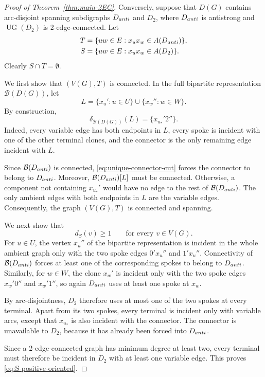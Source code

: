 \documentclass[10pt,a4paper]{amsart}
\newcommand{\UG}{\operatorname{UG}}
\newcommand{\cB}{\mathcal{B}}
\begin{document}
\begin{proof}[Proof of Theorem~\ref{thm:main-2EC}]
Conversely, suppose that $D(G)$ contains arc-disjoint spanning
subdigraphs $D_{\rm anti}$ and $D_2$, where $D_{\rm anti}$ is
antistrong and $\UG(D_2)$ is 2-edge-connected.  Let
\begin{align*}
 T&=\{uw\in E:x_ux_w\in A(D_{\rm anti})\},\\
 S&=\{uw\in E:x_ux_w\in A(D_2)\}.
\end{align*}
Clearly $S\cap T=\emptyset$.

We first show that $(V(G),T)$ is connected. In the full bipartite representation $\cB(D(G))$, let
\[
   L=\{x_u':u\in U\}\cup\{x_w'':w\in W\}.
\]
By construction,
\begin{equation}\label{eq:unique-connector-cut}
   \delta_{\cB(D(G))}(L)=\{x_{u_*}'2''\}.
\end{equation}
Indeed, every variable edge has both endpoints in $L$, every spoke is incident with one of the other terminal clones, and the connector is the only remaining edge incident with $L$.

Since $\cB(D_{\rm anti})$ is connected,
\eqref{eq:unique-connector-cut} forces the connector to belong to $D_{\rm anti}$.  Moreover, $\cB(D_{\rm anti})[L]$ must be connected.  Otherwise, a component not containing $x_{u_*}'$ would
have no edge to the rest of $\cB(D_{\rm anti})$. The only ambient edges with both endpoints in $L$ are the variable edges. Consequently, the graph $(V(G),T)$ is connected and spanning.

We next show that
\begin{equation}\label{eq:S-positive-oriented}
   d_S(v)\ge 1\qquad\text{for every }v\in V(G).
\end{equation}
For $u\in U$, the vertex $x_u''$ of the bipartite representation is
incident in the whole ambient graph only with the two spoke edges $0'x_u''$ and $1'x_u''$.  Connectivity of $\cB(D_{\rm anti})$ forces at least one of the corresponding spokes to
belong to $D_{\rm anti}$.  Similarly, for $w\in W$, the clone $x_w'$ is incident only with the two spoke edges $x_w'0''$ and $x_w'1''$, so again $D_{\rm anti}$ uses at least one spoke at $x_w$.

By arc-disjointness, $D_2$ therefore uses at most one of the two spokes at every terminal. Apart from its two spokes, every terminal is incident only with variable arcs, except that $x_{u_*}$ is also incident with the connector. The connector is unavailable to $D_2$, because it has already been forced into $D_{\rm anti}$.

Since a 2-edge-connected graph has minimum degree at least two, every terminal must therefore be incident in $D_2$ with at least one variable edge. This proves
\eqref{eq:S-positive-oriented}.


\end{proof}
\end{document}
